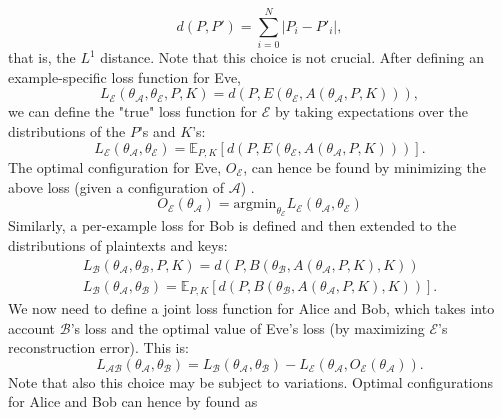 \documentclass[%
    corpo=11pt,
    twoside,
    stile=classica,
    oldstyle,
    autoretitolo,
    tipotesi=magistrale,
    greek,
    evenboxes,
    english
]{toptesi}
\begin{document}
\begin{equation}
d(P,P') = \sum_{i=0}^{N}|P_i - P'_i|,
\end{equation}
that is, the $L^1$ distance. Note that this choice is not crucial.  After defining an example-specific loss function for Eve,
\begin{equation*}
L_{\mathcal{E}}\left(\theta_{\mathcal{A}}, \theta_{\mathcal{E}}, P, K \right) = d\left(P, E(\theta_{\mathcal{E}}, A(\theta_{\mathcal{A}}, P, K) ) \right),
\end{equation*}
we can define the "true" loss function for $\mathcal{E}$ by taking expectations over the distributions of the $P$'s and $K$'s:
\begin{equation}
L_{\mathcal{E}}\left(\theta_{\mathcal{A}}, \theta_{\mathcal{E}}\right) = \mathbb{E}_{P,K} \left[ d\left(P, E(\theta_{\mathcal{E}}, A(\theta_{\mathcal{A}}, P, K) ) \right)\right].
\end{equation}
The optimal configuration for Eve, $O_{\mathcal{E}}$, can hence be found by minimizing the above loss (given a configuration of $\mathcal{A}$) .
\begin{equation}
O_{\mathcal{E}}\left(\theta_{\mathcal{A}} \right) = \textrm{argmin}_{\theta_{\mathcal{E}}}L_{\mathcal{E}}\left(\theta_{\mathcal{A}}, \theta_{\mathcal{E}}\right)
\end{equation}
Similarly, a per-example loss for Bob is defined and then extended to the distributions of plaintexts and keys:
\begin{align}
L_{\mathcal{B}}\left(\theta_{\mathcal{A}}, \theta_{\mathcal{B}}, P, K \right) = d\left(P, B(\theta_{\mathcal{B}}, A(\theta_{\mathcal{A}}, P, K), K ) \right) \nonumber \\ 
L_{\mathcal{B}}\left(\theta_{\mathcal{A}}, \theta_{\mathcal{B}}\right) = \mathbb{E}_{P,K}\left[ d\left(P, B(\theta_{\mathcal{B}}, A(\theta_{\mathcal{A}}, P, K), K ) \right)\right].
\end{align}
We now need to define a joint loss function for Alice and Bob, which takes into account $\mathcal{B}$'s loss and the optimal value of Eve's loss (by maximizing $\mathcal{E}$'s reconstruction error). This is: 
\begin{equation}
L_{\mathcal{A}\mathcal{B}}(\theta_{\mathcal{A}}, \theta_{\mathcal{B}}) = L_{\mathcal{B}}\left(\theta_{\mathcal{A}}, \theta_{\mathcal{B}}\right) - L_{\mathcal{E}}(\theta_{\mathcal{A}}, O_{\mathcal{E}}\left(\theta_{\mathcal{A}} \right)).
\end{equation}
Note that also this choice may be subject to variations. Optimal configurations for Alice and Bob can hence by found as 
\end{document}
